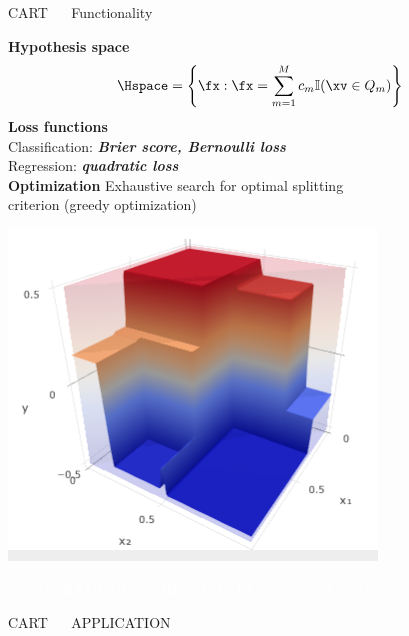 \documentclass[11pt,compress,t,notes=noshow, xcolor=table]{beamer}
\begin{document}
\begin{frame}{\textcolor{gray!80}{CART} ~~ Functionality}
\begin{minipage}{0.6\textwidth}
  \textbf{\textcolor{gray!80}{Hypothesis space}} \\
  $$\Hspace = \left\{ \fx: \fx = \sum_{m = 1}^M c_m \mathbb{I}(\xv \in Q_m) 
  \right\}$$
  \medskip
  \textbf{\textcolor{gray!80}{Loss functions}} \\
  Classification: \textit{\textbf{Brier score, Bernoulli loss}}  \\
  \medskip
  Regression: \textit{\textbf{quadratic loss}} \\
  \textbf{\textcolor{gray!80}{Optimization}} {}{} Exhaustive search for optimal 
  splitting \\ criterion (greedy optimization)
\end{minipage}%
\begin{minipage}{0.4\textwidth}
  \includegraphics[width=\textwidth]{figure/cart_3d.PNG}
\end{minipage}

\vfill

\colorbox{gray!80}{\textcolor{white}{NON-PARAMETRIC}} 
\colorbox{gray!80}{\textcolor{white}{WHITE-BOX}} 
\colorbox{gray!80}{\textcolor{white}{FEATURE SELECTION}}

\end{frame}


\begin{frame}{\textcolor{gray!60}{CART} ~~ APPLICATION}





\end{frame}
\end{document}
